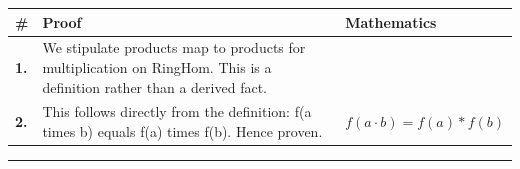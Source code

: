\documentclass[11pt]{article}
\theoremstyle{definition}
\begin{document}
\medskip
\noindent
\begin{tabular}{@{} >{\raggedright\arraybackslash}p{} >{\raggedright\arraybackslash}p{} >{\raggedleft\arraybackslash}p{} @{}}
\textbf{\#} & \textbf{Proof} & \textbf{Mathematics} \\
\midrule
\textbf{1.} & We stipulate products map to products for multiplication on RingHom. This is a definition rather than a derived fact. & \\[0.45em]
\textbf{2.} & This follows directly from the definition: f(a times b) equals f(a) times f(b). Hence proven. & $\displaystyle f(a \cdot b) = f(a) * f(b)$ \\[0.45em]
\bottomrule
\end{tabular}
\label{thm:RingHom-multiplication-products_map_to_products}
\par\medskip\hrule
\end{document}
